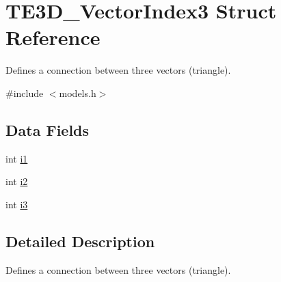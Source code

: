 \hypertarget{struct_t_e3_d___vector_index3}{\section{T\-E3\-D\-\_\-\-Vector\-Index3 Struct Reference}
\label{struct_t_e3_d___vector_index3}
}


Defines a connection between three vectors (triangle).  




{\ttfamily \#include $<$models.\-h$>$}

\subsection*{Data Fields}
\begin{DoxyCompactItemize}
\item 
int \hyperlink{struct_t_e3_d___vector_index3_ac1148b6c7c73300331ae93335f42241d}{i1}
\item 
int \hyperlink{struct_t_e3_d___vector_index3_a48d37c88961428889f8b283379ab961c}{i2}
\item 
int \hyperlink{struct_t_e3_d___vector_index3_a46d0b19c5363d1d6b47ff947ff767ecb}{i3}
\end{DoxyCompactItemize}


\subsection{Detailed Description}
Defines a connection between three vectors (triangle). 

